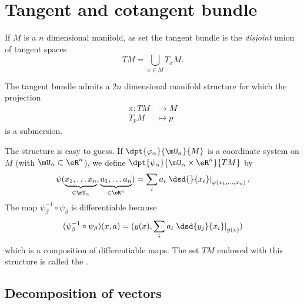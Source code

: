 \section{Tangent and cotangent bundle}

If $M$ is a $n$ dimensional manifold, as set the tangent bundle is the \emph{disjoint} union of tangent spaces
\begin{equation}
	TM=\bigcup_{x\in M}T_xM.
\end{equation}

\begin{theorem}
	The tangent bundle admits a $2n$ dimensional manifold structure for which the projection
	\begin{equation}
		\begin{aligned}
			\pi \colon TM & \to M     \\
			T_pM          & \mapsto p
		\end{aligned}
	\end{equation}
	is a submersion.
\end{theorem}

The structure is easy to guess. If $\dpt{\varphi_{\alpha}}{\mU_{\alpha}}{M}$ is a coordinate system on $M$ (with $\mU_{\alpha}\subset\eR^n$), we define $\dpt{\psi_{\alpha}}{\mU_{\alpha}\times \eR^n}{TM}$ by
\[
	\psi( \underbrace{x_1,\ldots x_n}_{\in\mU_{\alpha}},\underbrace{a_1,\ldots a_n}_{\in\eR^n}  )
	=\sum_i a_i\left.\dsd{}{x_i}\right|_{\varphi(x_1,\ldots,x_n)}.
\]
The map $\psi_{\beta}^{-1}\circ\psi_{\beta}$ is differentiable because
\[
	(\psi_{\beta}^{-1}\circ\psi_{\beta})(x,a)=( y(x),\sum_i a_i\left.\dsd{y_j}{x_i}\right|_{y(x)}  )
\]
which is a composition of differentiable maps. The set $TM$ endowed with this structure is called the .


\subsection{Decomposition of vectors}

